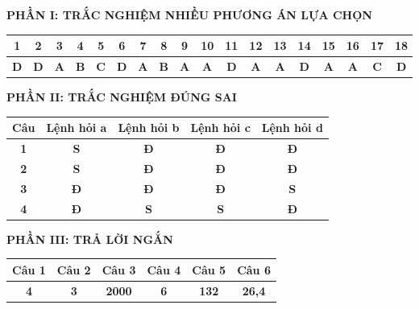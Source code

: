 \documentclass[11pt,a4paper]{article}
\begin{document}
\vspace{0.2cm}
\noindent\textbf{\color{mainGreen}PHẦN I: TRẮC NGHIỆM NHIỀU PHƯƠNG ÁN LỰA CHỌN}
\begin{center}
\renewcommand{\arraystretch}{1.2}
\begin{tabular}{|c|c|c|c|c|c|c|c|c|c|c|c|c|c|c|c|c|c|}
\hline
\textbf{1} & \textbf{2} & \textbf{3} & \textbf{4} & \textbf{5} & \textbf{6} & \textbf{7} & \textbf{8} & \textbf{9} & \textbf{10} & \textbf{11} & \textbf{12} & \textbf{13} & \textbf{14} & \textbf{15} & \textbf{16} & \textbf{17} & \textbf{18} \\ \hline
\textbf{\color{red}D} & \textbf{\color{red}D} & \textbf{\color{red}A} & \textbf{\color{red}B} & \textbf{\color{red}C} & \textbf{\color{red}D} & \textbf{\color{red}A} & \textbf{\color{red}B} & \textbf{\color{red}A} & \textbf{\color{red}A} & \textbf{\color{red}D} & \textbf{\color{red}A} & \textbf{\color{red}A} & \textbf{\color{red}D} & \textbf{\color{red}A} & \textbf{\color{red}A} & \textbf{\color{red}C} & \textbf{\color{red}D} \\ \hline
\end{tabular}
\end{center}

\vspace{0.3cm}
\noindent\textbf{\color{mainGreen}PHẦN II: TRẮC NGHIỆM ĐÚNG SAI}
\begin{center}
\renewcommand{\arraystretch}{1.2}
\begin{tabular}{|c|c|c|c|c|}
\hline
\textbf{Câu} & \textbf{Lệnh hỏi a} & \textbf{Lệnh hỏi b} & \textbf{Lệnh hỏi c} & \textbf{Lệnh hỏi d} \\ \hline
\textbf{1} & \textbf{S} & \textbf{\color{red}Đ} & \textbf{\color{red}Đ} & \textbf{\color{red}Đ} \\ \hline
\textbf{2} & \textbf{S} & \textbf{\color{red}Đ} & \textbf{\color{red}Đ} & \textbf{\color{red}Đ} \\ \hline
\textbf{3} & \textbf{\color{red}Đ} & \textbf{\color{red}Đ} & \textbf{\color{red}Đ} & \textbf{S} \\ \hline
\textbf{4} & \textbf{\color{red}Đ} & \textbf{S} & \textbf{S} & \textbf{\color{red}Đ} \\ \hline
\end{tabular}
\end{center}

\vspace{0.3cm}
\noindent\textbf{\color{mainGreen}PHẦN III: TRẢ LỜI NGẮN}
\begin{center}
\renewcommand{\arraystretch}{1.2}
\begin{tabular}{|c|c|c|c|c|c|}
\hline
\textbf{Câu 1} & \textbf{Câu 2} & \textbf{Câu 3} & \textbf{Câu 4} & \textbf{Câu 5} & \textbf{Câu 6} \\ \hline
\textbf{\color{red}4} & \textbf{\color{red}3} & \textbf{\color{red}2000} & \textbf{\color{red}6} & \textbf{\color{red}132} & \textbf{\color{red}26,4} \\ \hline
\end{tabular}
\end{center}
\end{document}
